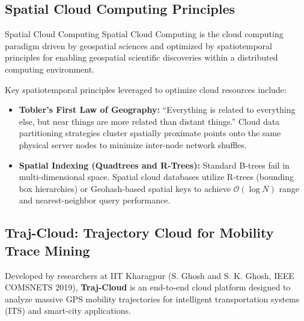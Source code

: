 \documentclass[11pt,a4paper,openany]{report}
\begin{document}
\subsection{Spatial Cloud Computing Principles}
\begin{defbox}{Spatial Cloud Computing}
Spatial Cloud Computing is the cloud computing paradigm driven by geospatial sciences and optimized by spatiotemporal principles for enabling geospatial scientific discoveries within a distributed computing environment.
\end{defbox}

Key spatiotemporal principles leveraged to optimize cloud resources include:
\begin{itemize}[leftmargin=*]
  \item \textbf{Tobler's First Law of Geography:} ``Everything is related to everything else, but near things are more related than distant things.'' Cloud data partitioning strategies cluster spatially proximate points onto the same physical server nodes to minimize inter-node network shuffles.
  \item \textbf{Spatial Indexing (Quadtrees and R-Trees):} Standard B-trees fail in multi-dimensional space. Spatial cloud databases utilize R-trees (bounding box hierarchies) or Geohash-based spatial keys to achieve $\mathcal{O}(\log N)$ range and nearest-neighbor query performance.
\end{itemize}

\subsection{Traj-Cloud: Trajectory Cloud for Mobility Trace Mining}
Developed by researchers at IIT Kharagpur (S. Ghosh and S. K. Ghosh, IEEE COMSNETS 2019), \textbf{Traj-Cloud} is an end-to-end cloud platform designed to analyze massive GPS mobility trajectories for intelligent transportation systems (ITS) and smart-city applications.
\end{document}
